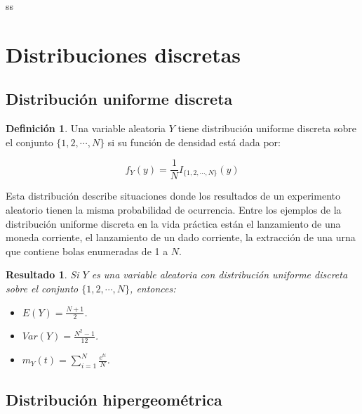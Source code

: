\documentclass[
  10pt,
  spanish,
]{book}
\providecommand{\tightlist}{%
  \setlength{\itemsep}{0pt}\setlength{\parskip}{0pt}}
\newtheorem{proposition}{Resultado}[chapter]
\theoremstyle{definition}
\newtheorem{definition}{Definición}[chapter]
\theoremstyle{definition}
\theoremstyle{definition}
\theoremstyle{definition}
\theoremstyle{remark}
\begin{document}
ss

\hypertarget{distribuciones-discretas}{%
\section{Distribuciones discretas}\label{distribuciones-discretas}}

\hypertarget{distribuciuxf3n-uniforme-discreta}{%
\subsection{Distribución uniforme discreta}\label{distribuciuxf3n-uniforme-discreta}}

\begin{definition}
\protect\hypertarget{def:unnamed-chunk-1}{}{\label{def:unnamed-chunk-1} }Una variable aleatoria \(Y\) tiene distribución uniforme discreta sobre el conjunto \(\{1,2,\cdots,N\}\) si su función de densidad está dada por:

\begin{equation}
f_Y(y)=\frac{1}{N}I_{\{1,2,\cdots,N\}}(y)
\end{equation}
\end{definition}

Esta distribución describe situaciones donde los resultados de un experimento aleatorio tienen la misma probabilidad de ocurrencia. Entre los ejemplos de la distribución uniforme discreta en la vida práctica están el lanzamiento de una moneda corriente, el lanzamiento de un dado corriente, la extracción de una urna que contiene bolas enumeradas de 1 a \(N\).

\begin{proposition}
\protect\hypertarget{prp:unnamed-chunk-2}{}{\label{prp:unnamed-chunk-2} }Si \(Y\) es una variable aleatoria con distribución uniforme discreta sobre el conjunto \(\{1,2,\cdots,N\}\), entonces:

\begin{itemize}
\tightlist
\item
  \(E(Y)=\frac{N+1}{2}\).
\item
  \(Var(Y)=\frac{N^2-1}{12}\).
\item
  \(m_Y(t)=\sum_{i=1}^N\frac{e^{ti}}{N}\).
\end{itemize}
\end{proposition}

\hypertarget{distribuciuxf3n-hipergeomuxe9trica}{%
\subsection{Distribución hipergeométrica}\label{distribuciuxf3n-hipergeomuxe9trica}}
\end{document}
